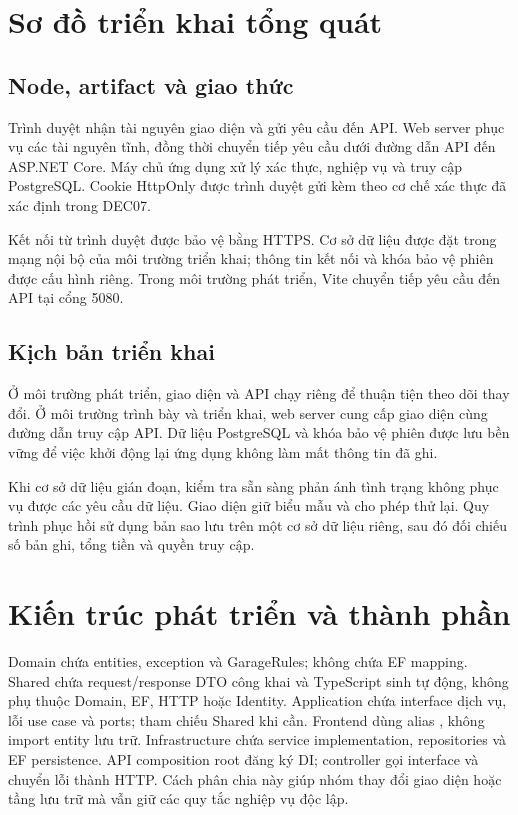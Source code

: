 \section{Sơ đồ triển khai tổng quát}
\subsection{Node, artifact và giao thức}
Trình duyệt nhận tài nguyên giao diện và gửi yêu cầu đến API. Web server phục vụ các tài nguyên tĩnh, đồng thời chuyển tiếp yêu cầu dưới đường dẫn API đến ASP.NET Core. Máy chủ ứng dụng xử lý xác thực, nghiệp vụ và truy cập PostgreSQL. Cookie HttpOnly được trình duyệt gửi kèm theo cơ chế xác thực đã xác định trong DEC07.

Kết nối từ trình duyệt được bảo vệ bằng HTTPS. Cơ sở dữ liệu được đặt trong mạng nội bộ của môi trường triển khai; thông tin kết nối và khóa bảo vệ phiên được cấu hình riêng. Trong môi trường phát triển, Vite chuyển tiếp yêu cầu đến API tại cổng 5080.

\subsection{Kịch bản triển khai}
Ở môi trường phát triển, giao diện và API chạy riêng để thuận tiện theo dõi thay đổi. Ở môi trường trình bày và triển khai, web server cung cấp giao diện cùng đường dẫn truy cập API. Dữ liệu PostgreSQL và khóa bảo vệ phiên được lưu bền vững để việc khởi động lại ứng dụng không làm mất thông tin đã ghi.

Khi cơ sở dữ liệu gián đoạn, kiểm tra sẵn sàng phản ánh tình trạng không phục vụ được các yêu cầu dữ liệu. Giao diện giữ biểu mẫu và cho phép thử lại. Quy trình phục hồi sử dụng bản sao lưu trên một cơ sở dữ liệu riêng, sau đó đối chiếu số bản ghi, tổng tiền và quyền truy cập.

\section{Kiến trúc phát triển và thành phần}
Domain chứa entities, exception và GarageRules; không chứa EF mapping. Shared chứa request/response DTO công khai và TypeScript sinh tự động, không phụ thuộc Domain, EF, HTTP hoặc Identity. Application chứa interface dịch vụ, lỗi use case và ports; tham chiếu Shared khi cần. Frontend dùng alias , không import entity lưu trữ. Infrastructure chứa service implementation, repositories và EF persistence. API composition root đăng ký DI; controller gọi interface và chuyển lỗi thành HTTP. Cách phân chia này giúp nhóm thay đổi giao diện hoặc tầng lưu trữ mà vẫn giữ các quy tắc nghiệp vụ độc lập.
